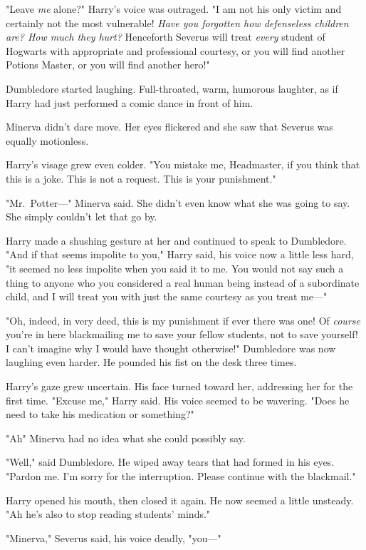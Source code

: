"Leave \emph{me} alone?" Harry's voice was outraged. "I am not his only victim
and certainly not the most vulnerable! \emph{Have you forgotten how defenseless
children are? How much they hurt?} Henceforth Severus will treat \emph{every}
student of Hogwarts with appropriate and professional courtesy, or you will
find another Potions Master, or you will find another hero!"

Dumbledore started laughing. Full-throated, warm, humorous laughter, as if
Harry had just performed a comic dance in front of him.

Minerva didn't dare move. Her eyes flickered and she saw that Severus was
equally motionless.

Harry's visage grew even colder. "You mistake me, Headmaster, if you think that
this is a joke. This is not a request. This is your punishment."

"Mr.~Potter\mbox{---}" Minerva said. She didn't even know what she was going to say.
She simply couldn't let that go by.

Harry made a shushing gesture at her and continued to speak to Dumbledore. "And
if that seems impolite to you," Harry said, his voice now a little less hard,
"it seemed no less impolite when you said it to me. You would not say such a
thing to anyone who you considered a real human being instead of a subordinate
child, and I will treat you with just the same courtesy as you treat me\mbox{---}"

"Oh, indeed, in very deed, this is my punishment if ever there was one! Of
\emph{course} you're in here blackmailing me to save your fellow students, not
to save yourself! I can't imagine why I would have thought otherwise!"
Dumbledore was now laughing even harder. He pounded his fist on the desk three
times.

Harry's gaze grew uncertain. His face turned toward her, addressing her for the
first time. "Excuse me," Harry said. His voice seemed to be wavering. "Does he
need to take his medication or something?"

"Ah{\el}" Minerva had no idea what she could possibly say.

"Well," said Dumbledore. He wiped away tears that had formed in his eyes.
"Pardon me. I'm sorry for the interruption. Please continue with the blackmail."

Harry opened his mouth, then closed it again. He now seemed a little unsteady.
"Ah{\el} he's also to stop reading students' minds."

"Minerva," Severus said, his voice deadly, "you\mbox{---}"

